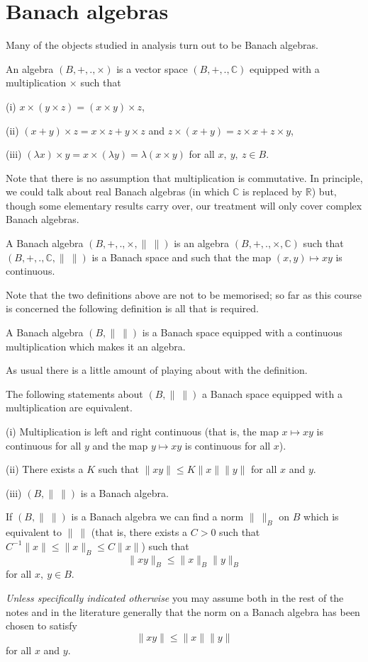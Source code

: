\section{Banach algebras} Many of the objects studied
in analysis turn out to be Banach algebras.
\begin{definition} An algebra $(B,+,.,\times)$
is a vector space $(B,+,.,{\mathbb C})$ equipped
with a multiplication $\times$ such that

(i) $x\times( y\times z)=(x\times y)\times z$,

(ii) $(x+y)\times z=x\times z+y\times z$
and $z\times(x+y)=z\times x+z\times y$,

(iii) $(\lambda x)\times y=x\times(\lambda y)=\lambda(x\times y)$
for all $x,\ y,\ z\in B$.

\noindent[We shall write $x\times y=xy$.]
\end{definition}
Note that there is no assumption that multiplication
is commutative. In principle, we could talk about
real Banach algebras (in which ${\mathbb C}$ is replaced by
${\mathbb R}$) but, though some elementary results carry
over, our treatment will only cover complex Banach algebras.
\begin{definition} A Banach algebra 
$(B,+,.,\times,\|\ \|)$ is an algebra
$(B,+,.,\times,{\mathbb C})$ such that
$(B,+,.,{\mathbb C},\|\ \|)$ is a 
Banach space and such that the map $(x,y)\mapsto xy$
is continuous.
\end{definition}

Note that the two definitions above are not to
be memorised; so far as this course is concerned the
following definition is all that is required.
\begin{definition} A Banach algebra $(B,\|\ \|)$
is a Banach space equipped with a continuous multiplication
which makes it an algebra.
\end{definition}
As usual there is a little amount of playing about
with the definition.
\begin{lemma} The following statements about
$(B,\|\ \|)$ a Banach space equipped with a multiplication
are equivalent.

(i) Multiplication is left and right continuous
(that is, the map $x\mapsto xy$ is continuous
for all $y$ and the map $y\mapsto xy$ is continuous
for all $x$).

(ii) There exists a $K$ such that $\|xy\|\leq K\|x\|\|y\|$
for all $x$ and $y$.

(iii) $(B,\|\ \|)$ is a Banach algebra.
\end{lemma}
\begin{lemma}\label{Lemma, renorm}
If $(B,\|\ \|)$ is a Banach algebra
we can find a norm $\|\ \|_{B}$ on $B$ which is
equivalent to $\|\ \|$ (that is, there exists a $C>0$
such that $C^{-1}\|x\|\leq \|x\|_{B}\leq C\|x\|$)
such that
\[\|xy\|_{B}\leq \|x\|_{B}\|y\|_{B}\]
for all $x,\ y\in B$.
\end{lemma}
\emph{Unless specifically indicated otherwise} you
may assume both in the rest of the notes and in the
literature generally that the norm on a Banach algebra
has been chosen to satisfy
\[\|xy\|\leq \|x\|\|y\|\]
for all $x$ and $y$.

